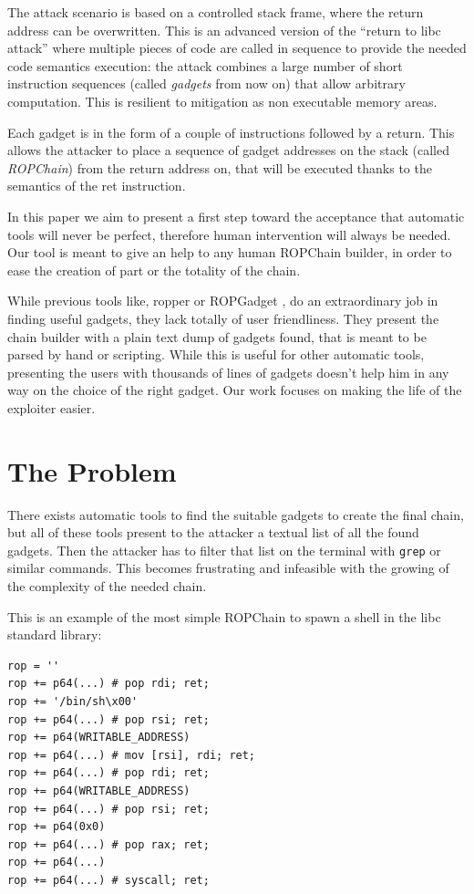 \documentclass[twocolumn, 11pt]{article}
\begin{document}
The attack scenario is based on a controlled stack frame, where the return address can be overwritten. This is an advanced version of the ``return to libc attack'' \cite{libc} where multiple pieces of code are called in sequence to provide the needed code semantics execution: the attack combines a large number of short instruction sequences (called \textit{gadgets} from now on) that allow arbitrary computation. This is resilient to mitigation as non executable memory areas.

Each gadget is in the form of a couple of instructions followed by a return. This allows the attacker to place a sequence of gadget addresses on the stack (called \textit{ROPChain}) from the return address on, that will be executed thanks to the semantics of the ret instruction.

In this paper we aim to present a first step toward the acceptance that automatic tools will never be perfect, therefore human intervention will always be needed. Our tool is meant to give an help to any human ROPChain builder, in order to ease the creation of part or the totality of the chain.

While previous tools like, ropper \cite{ropper} or ROPGadget \cite{ROPGadget}, do an extraordinary job in finding useful gadgets, they lack totally of user friendliness. They present the chain builder with a plain text dump of gadgets found, that is meant to be parsed by hand or scripting. While this is useful for other automatic tools, presenting the users with thousands of lines of gadgets doesn't help him in any way on the choice of the right gadget. Our work focuses on making the life of the exploiter easier.

\section{The Problem}
There exists automatic tools to find the suitable gadgets to create the final chain, but all of these tools present to the attacker a textual list of all the found gadgets. Then the attacker has to filter that list on the terminal with \texttt{grep} or similar commands. This becomes frustrating and infeasible with the growing of the complexity of the needed chain.

This is an example of the most simple ROPChain to spawn a shell in the libc standard library:

\begin{lstlisting}
rop = ''
rop += p64(...) # pop rdi; ret;
rop += '/bin/sh\x00'
rop += p64(...) # pop rsi; ret;
rop += p64(WRITABLE_ADDRESS)
rop += p64(...) # mov [rsi], rdi; ret;
rop += p64(...) # pop rdi; ret;
rop += p64(WRITABLE_ADDRESS)
rop += p64(...) # pop rsi; ret;
rop += p64(0x0)
rop += p64(...) # pop rax; ret;
rop += p64(...)
rop += p64(...) # syscall; ret;
\end{lstlisting}
\end{document}
